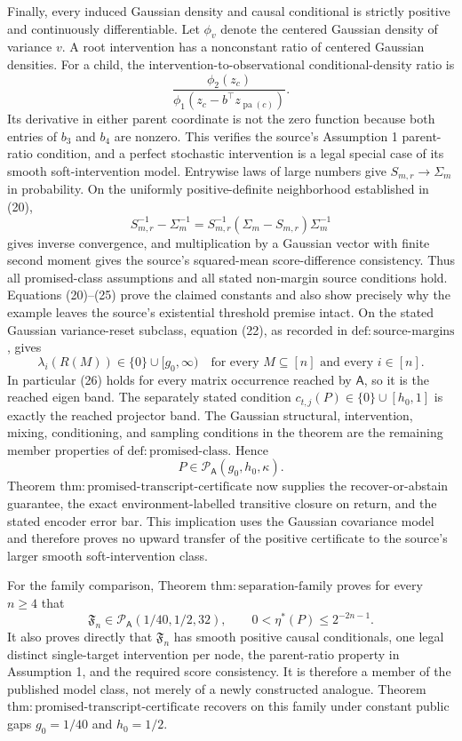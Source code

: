Finally, every induced Gaussian density and causal conditional is strictly positive and continuously differentiable.  Let \(\phi_v\) denote the centered Gaussian density of variance \(v\).  A root intervention has a nonconstant ratio of centered Gaussian densities.  For a child, the intervention-to-observational conditional-density ratio is
\[
 \frac{\phi_2(z_c)}{\phi_1(z_c-b^{\top}z_{\operatorname{pa}(c)})}.
\]
Its derivative in either parent coordinate is not the zero function because both entries of \(b_3\) and \(b_4\) are nonzero.  This verifies the source's Assumption 1 parent-ratio condition, and a perfect stochastic intervention is a legal special case of its smooth soft-intervention model.  Entrywise laws of large numbers give \(S_{m,r}\to\Sigma_m\) in probability.  On the uniformly positive-definite neighborhood established in (20),
\[
 S_{m,r}^{-1}-\Sigma_m^{-1}
 =S_{m,r}^{-1}(\Sigma_m-S_{m,r})\Sigma_m^{-1}
\]
gives inverse convergence, and multiplication by a Gaussian vector with finite second moment gives the source's squared-mean score-difference consistency.  Thus all promised-class assumptions and all stated non-margin source conditions hold.  Equations (20)--(25) prove the claimed constants and also show precisely why the example leaves the source's existential threshold premise intact.
On the stated Gaussian variance-reset subclass, equation (22), as recorded in \(\mathrm{def{:}source\mbox{-}margins}\), gives
\[
 \lambda_i(R(M))\in\{0\}\cup[g_0,\infty)
 \quad\text{for every }M\subseteq[n]\text{ and every }i\in[n].
 \tag{26}
\]
In particular (26) holds for every matrix occurrence reached by \(\mathsf A\), so it is the reached eigen band.  The separately stated condition \(c_{t,j}(P)\in\{0\}\cup[h_0,1]\) is exactly the reached projector band.  The Gaussian structural, intervention, mixing, conditioning, and sampling conditions in the theorem are the remaining member properties of \(\mathrm{def{:}promised\mbox{-}class}\).  Hence
\[
 P\in\mathcal P_{\mathsf A}(g_0,h_0,\kappa).
\]
Theorem \(\mathrm{thm{:}promised\mbox{-}transcript\mbox{-}certificate}\) now supplies the recover-or-abstain guarantee, the exact environment-labelled transitive closure on return, and the stated encoder error bar.  This implication uses the Gaussian covariance model and therefore proves no upward transfer of the positive certificate to the source's larger smooth soft-intervention class.

For the family comparison, Theorem \(\mathrm{thm{:}separation\mbox{-}family}\) proves for every \(n\ge4\) that
\[
 \mathfrak F_n\in\mathcal P_{\mathsf A}(1/40,1/2,32),
 \qquad
 0<\eta^{\ast}(P)\le2^{-2n-1}.
 \tag{27}
\]
It also proves directly that \(\mathfrak F_n\) has smooth positive causal conditionals, one legal distinct single-target intervention per node, the parent-ratio property in Assumption 1, and the required score consistency.  It is therefore a member of the published model class, not merely of a newly constructed analogue.  Theorem \(\mathrm{thm{:}promised\mbox{-}transcript\mbox{-}certificate}\) recovers on this family under constant public gaps \(g_0=1/40\) and \(h_0=1/2\).

